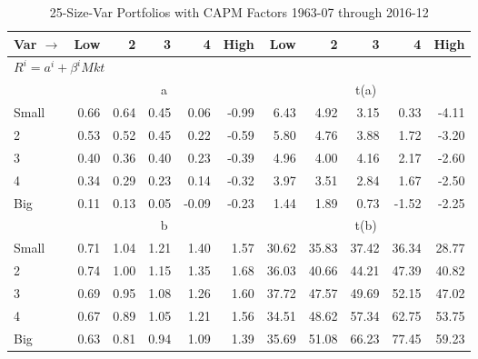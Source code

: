 
\begin{table}[!ht]
\centering
\caption{25-Size-Var Portfolios with CAPM Factors 1963-07 through 2016-12}
\begin{tabular}{lrrrrrrrrrr}
  \toprule
    Var $\rightarrow$ & Low & 2 & 3 & 4 & High & Low & 2 & 3 & 4 & High \\ 
  \midrule
  \multicolumn{11}{l}{$R^i=a^i+\beta^iMkt$} \\

  
    
      & \multicolumn{5}{c}{a} & \multicolumn{5}{c}{t(a)}
    
    \\
      \cmidrule(r){2-6} \cmidrule(r){7-11}

    Small   & 0.66  & 0.64  & 0.45  & 0.06  & -0.99  & 6.43  & 4.92  & 3.15  & 0.33  & -4.11  \\
         2  & 0.53  & 0.52  & 0.45  & 0.22  & -0.59  & 5.80  & 4.76  & 3.88  & 1.72  & -3.20  \\
         3  & 0.40  & 0.36  & 0.40  & 0.23  & -0.39  & 4.96  & 4.00  & 4.16  & 2.17  & -2.60  \\
         4  & 0.34  & 0.29  & 0.23  & 0.14  & -0.32  & 3.97  & 3.51  & 2.84  & 1.67  & -2.50  \\
    Big     & 0.11  & 0.13  & 0.05  & -0.09  & -0.23  & 1.44  & 1.89  & 0.73  & -1.52  & -2.25  \\

  
    
      & \multicolumn{5}{c}{b} & \multicolumn{5}{c}{t(b)}
    
    \\
      \cmidrule(r){2-6} \cmidrule(r){7-11}

    Small   & 0.71  & 1.04  & 1.21  & 1.40  & 1.57  & 30.62  & 35.83  & 37.42  & 36.34  & 28.77  \\
         2  & 0.74  & 1.00  & 1.15  & 1.35  & 1.68  & 36.03  & 40.66  & 44.21  & 47.39  & 40.82  \\
         3  & 0.69  & 0.95  & 1.08  & 1.26  & 1.60  & 37.72  & 47.57  & 49.69  & 52.15  & 47.02  \\
         4  & 0.67  & 0.89  & 1.05  & 1.21  & 1.56  & 34.51  & 48.62  & 57.34  & 62.75  & 53.75  \\
    Big     & 0.63  & 0.81  & 0.94  & 1.09  & 1.39  & 35.69  & 51.08  & 66.23  & 77.45  & 59.23  \\

  

  \bottomrule
\end{tabular}
\label{tbl:25_Size_Var_CAPM}
\end{table}